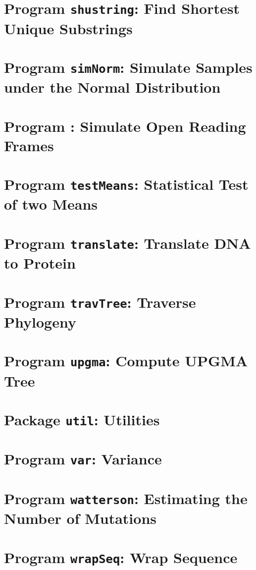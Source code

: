 \documentclass[a4paper]{report}
\begin{document}
\chapter{Program \texttt{shustring}: Find Shortest Unique Substrings}\label{ch:shu}

\chapter{Program \texttt{simNorm}: Simulate Samples under the Normal
  Distribution}\label{ch:sn}

\chapter{Program : Simulate Open Reading
  Frames}\label{ch:so}

\chapter{Program \texttt{testMeans}: Statistical Test of two Means}\label{ch:tm}

\chapter{Program \texttt{translate}: Translate DNA to
  Protein}\label{ch:tr}

\chapter{Program \texttt{travTree}: Traverse Phylogeny}\label{ch:tt}

\chapter{Program \texttt{upgma}: Compute UPGMA Tree}\label{ch:upgma}

\chapter{Package \texttt{util}: Utilities}\label{ch:uti}

\chapter{Program \texttt{var}: Variance}\label{ch:var}

\chapter{Program \texttt{watterson}: Estimating the Number of Mutations}\label{ch:wat}

\chapter{Program \texttt{wrapSeq}: Wrap Sequence}\label{ch:wra}



\end{document}
